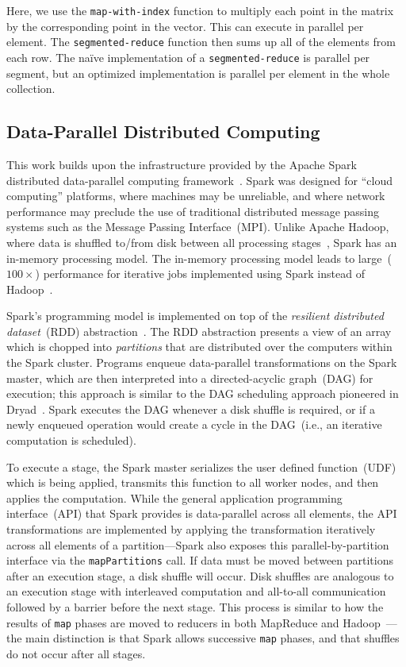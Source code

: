 \documentclass[preprint]{sigplanconf}
\theoremstyle{definition}
\begin{document}
Here, we use the \texttt{map-with-index} function to multiply each point in the matrix by the
corresponding point in the vector. This can execute in parallel per element. The
\texttt{segmented-reduce} function then sums up all of the elements from each row. The na\"{i}ve
implementation of a \texttt{segmented-reduce} is parallel per segment, but an optimized implementation
is parallel per element in the whole collection.

\subsection{Data-Parallel Distributed Computing}
\label{sec:data-parallel-distributed-computing}

This work builds upon the infrastructure provided by the Apache Spark distributed data-parallel
computing framework~\cite{spark, zaharia10}. Spark was designed for ``cloud computing'' platforms,
where machines may be unreliable, and where network performance may preclude the use of traditional
distributed message passing systems such as the Message Passing Interface~(MPI). Unlike Apache
Hadoop, where data is shuffled to/from disk between all processing stages~\cite{hadoop, shvachko10},
Spark has an in-memory processing model. The in-memory processing model leads to
large~($100\times$) performance for iterative jobs implemented using Spark instead of
Hadoop~\cite{zaharia10}.

Spark's programming model is implemented on top of the \emph{resilient distributed dataset}~(RDD)
abstraction~\cite{zaharia12}. The RDD abstraction presents a view of an array which is chopped into
\emph{partitions} that are distributed over the computers within the Spark cluster. Programs enqueue
data-parallel transformations on the Spark master, which are then interpreted into a directed-acyclic
graph~(DAG) for execution; this approach is similar to the DAG scheduling approach pioneered in
Dryad~\cite{isard07}. Spark executes the DAG whenever a disk shuffle is required, or if a newly
enqueued operation would create a cycle in the DAG~(i.e., an iterative computation is scheduled).

To execute a stage, the Spark master serializes the user defined function~(UDF) which is being applied,
transmits this function to all worker nodes, and then applies the computation. While the general
application programming interface~(API) that Spark provides is data-parallel across all elements,
the API transformations are implemented by applying the transformation iteratively across all elements
of a partition---Spark also exposes this parallel-by-partition interface via the \texttt{mapPartitions} call.
If data must be moved between partitions after an execution stage, a disk shuffle will occur. Disk
shuffles are analogous to an execution stage with interleaved computation and all-to-all communication
followed by a barrier before the next stage. This process is similar to how the results of \texttt{map}
phases are moved to reducers in both MapReduce and Hadoop~\cite{dean04}---the main distinction is
that Spark allows successive \texttt{map} phases, and that shuffles do not occur after all stages.
\end{document}
